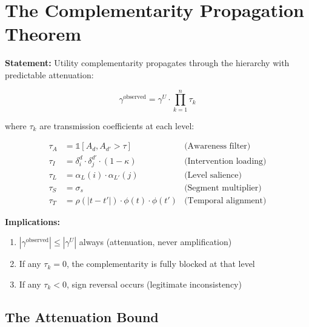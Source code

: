 \section{The Complementarity Propagation Theorem}
\label{sec:gtc-propagation}

\begin{tcolorbox}[colback=green!5!white, colframe=green!75!black,
    title=Theorem UNMAPPED_GTC-5: Complementarity Propagation]

\textbf{Statement:} Utility complementarity propagates through the hierarchy
with predictable attenuation:

\begin{equation}
\boxed{
\gamma^{\text{observed}} = \gamma^U \cdot \prod_{k=1}^{n} \tau_k
}
\end{equation}

where $\tau_k$ are transmission coefficients at each level:

\begin{align}
\tau_A &= \mathbb{1}[A_d, A_{d'} > \tau] & \text{(Awareness filter)} \\
\tau_I &= \delta_i^d \cdot \delta_j^{d'} \cdot (1 - \kappa) & \text{(Intervention loading)} \\
\tau_L &= \alpha_L(i) \cdot \alpha_{L'}(j) & \text{(Level salience)} \\
\tau_S &= \sigma_s & \text{(Segment multiplier)} \\
\tau_T &= \rho(|t-t'|) \cdot \phi(t) \cdot \phi(t') & \text{(Temporal alignment)}
\end{align}

\textbf{Implications:}
\begin{enumerate}
    \item $|\gamma^{\text{observed}}| \leq |\gamma^U|$ always (attenuation, never amplification)
    \item If any $\tau_k = 0$, the complementarity is fully blocked at that level
    \item If any $\tau_k < 0$, sign reversal occurs (legitimate inconsistency)
\end{enumerate}

\end{tcolorbox}

\subsection{The Attenuation Bound}

